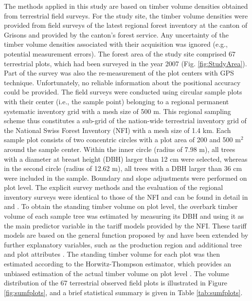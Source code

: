 The methods applied in this study are based on timber volume densities obtained from terrestrial field surveys. For the study site, the timber volume densities were provided from field surveys of the latest regional forest inventory at the canton of Grisons and provided by the canton's forest service. Any uncertainty of the timber volume densities associated with their acquisition was ignored (e.g., potential measurement errors). The forest area of the study site comprised 67 terrestrial plots, which had been surveyed in the year 2007 (Fig. \ref{fig:StudyArea}). Part of the survey was also the re-measurement of the plot centers with GPS technique. Unfortunately, no reliable information about the positional accuracy could be provided. The field surveys were conducted using circular sample plots with their center (i.e., the sample point) belonging to a regional permanent systematic inventory grid with a mesh size of 500 m. This regional sampling scheme thus constitutes a sub-grid of the nation-wide terrestrial inventory grid of the National Swiss Forest Inventory (NFI) with a mesh size of 1.4 km. Each sample plot consists of two concentric circles with a plot area of 200 and 500 m$^2$ around the sample center. Within the inner circle (radius of 7.98 m), all trees with a diameter at breast height (DBH) larger than 12 cm were selected, whereas in the second circle (radius of 12.62 m), all trees with a DBH larger than 36 cm were included in the sample. Boundary and slope adjustments were performed on plot level. The explicit survey methods and the evaluation of the regional inventory surveys were identical to those of the NFI and can be found in detail in \citet{brassel2001} and \citet{keller2011}. To obtain the standing timber volume on plot level, the overbark timber volume of each sample tree was estimated by measuring its DBH and using it as the main predictor variable in the tariff models provided by the NFI. These tariff models are based on the general function proposed by \citet{hoffmann1982} and have been extended by further explanatory variables, such as the production region and additional tree and plot attributes \citep{brassel2001}. The standing timber volume for each plot was then estimated according to the Horwitz-Thompson estimator, which provides an unbiased estimation of the actual timber volume on plot level \citep{mandallaz2008}. The volume distribution of the 67 terrestrial observed field plots is illustrated in Figure \ref{fig:sumfplots}, and a brief statistical summary is given in Table \ref{tab:sumfplots}.


